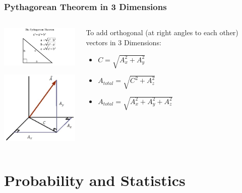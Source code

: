 \documentclass{beamer}
\begin{document}
\begin{frame}\frametitle{Pythagorean Theorem in 3 Dimensions}
\begin{columns}
\begin{column}{5cm}
\begin{center}
\includegraphics[width=5cm]{fig/pathagorean.png}

\vspace{0.25cm}

\includegraphics[width=4cm]{fig/pathag3D.jpg}

\end{center}
\end{column}
\begin{column}{5cm}
To add orthogonal (at right angles to each other) vectors in 3 Dimensions:
\begin{itemize}
\item $C = \sqrt{A_x^2 + A_y^2}$
\item $A_{total} = \sqrt{C^2 + A_z^2}$
\item $A_{total} = \sqrt{A_x^2 + A_y^2 + A_z^2}$
\end{itemize}
\end{column}
\end{columns}
\end{frame}





\section{Probability and Statistics}
\end{document}
